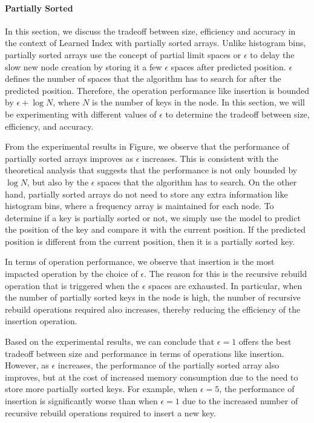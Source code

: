 \documentclass[11pt,a4paper]{article}
\newcommand{\learnindex}{\textsf{Learned Index}\xspace}
\begin{document}
\paragraph{Partially Sorted} 
In this section, we discuss the tradeoff between size, efficiency and accuracy in the context of \learnindex with partially sorted arrays. Unlike histogram bins, partially sorted arrays use the concept of partial limit spaces or $\epsilon$ to delay the slow new node creation by storing it a few $\epsilon$ spaces after predicted position. $\epsilon$ defines the number of spaces that the algorithm has to search for after the predicted position. Therefore, the operation performance like insertion is bounded by $\epsilon + \log N$, where $N$ is the number of keys in the node. In this section, we will be experimenting with different values of $\epsilon$ to determine the tradeoff between size, efficiency, and accuracy.

From the experimental results in Figure, we observe that the performance of partially sorted arrays improves as $\epsilon$ increases. This is consistent with the theoretical analysis that suggests that the performance is not only bounded by $\log N$, but also by the $\epsilon$ spaces that the algorithm has to search. On the other hand, partially sorted arrays do not need to store any extra information like histogram bins, where a frequency array is maintained for each node. To determine if a key is partially sorted or not, we simply use the model to predict the position of the key and compare it with the current position. If the predicted position is different from the current position, then it is a partially sorted key.

In terms of operation performance, we observe that insertion is the most impacted operation by the choice of $\epsilon$. The reason for this is the recursive rebuild operation that is triggered when the $\epsilon$ spaces are exhausted. In particular, when the number of partially sorted keys in the node is high, the number of recursive rebuild operations required also increases, thereby reducing the efficiency of the insertion operation.

Based on the experimental results, we can conclude that $\epsilon = 1$ offers the best tradeoff between size and performance in terms of operations like insertion. However, as $\epsilon$ increases, the performance of the partially sorted array also improves, but at the cost of increased memory consumption due to the need to store more partially sorted keys. For example, when $\epsilon = 5$, the performance of insertion is significantly worse than when $\epsilon = 1$ due to the increased number of recursive rebuild operations required to insert a new key.
\end{document}
